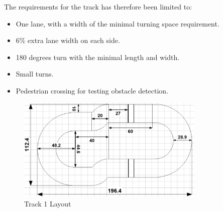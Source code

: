 The requirements for the track has therefore been limited to:
\cite{DriveingCurves}
\begin{itemize}
  \item One lane, with a width of the minimal turning space requirement.
  \item 6\% extra lane width on each side.
  \item 180 degrees turn with the minimal length and width.
  \item Small turns.
  \item Pedestrian crossing for testing obstacle detection.
\end{itemize}

\begin{figure}[H]
    \label{Track1Layout}
    \centering
    \includegraphics[width=0.8\textwidth]{Images/Tracks/Track1.PNG}
    \caption{Track 1 Layout}
\end{figure}








